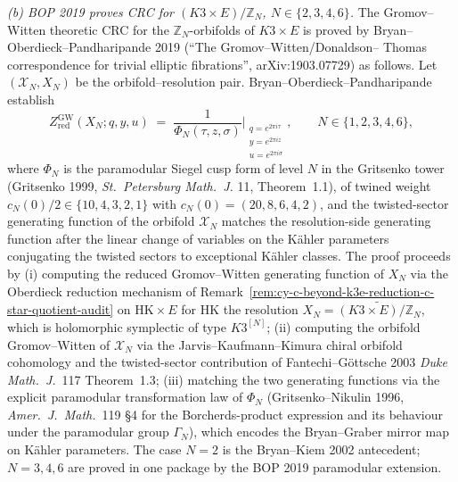 \begin{remark}
\emph{\textup{(b)} BOP 2019 proves CRC for $(K3\times
E)/\mathbb Z_N$, $N\in\{2,3,4,6\}$.} The Gromov--Witten theoretic CRC
for the $\mathbb Z_N$-orbifolds of $K3\times E$ is proved by
Bryan--Oberdieck--Pandharipande 2019 (``The Gromov--Witten/Donaldson--%
Thomas correspondence for trivial elliptic fibrations'',
arXiv:1903.07729) as follows. Let $(\mathcal X_N,X_N)$ be the
orbifold--resolution pair. Bryan--Oberdieck--Pandharipande establish
\[
 Z^{\mathrm{GW}}_{\mathrm{red}}(X_N;q,y,u)
 \;=\; \frac{1}{\Phi_N(\tau,z,\sigma)}\Big|_{\substack{q=e^{2\pi i\tau}\\y=e^{2\pi iz}\\u=e^{2\pi i\sigma}}},
 \qquad
 N\in\{1,2,3,4,6\},
\]
where $\Phi_N$ is the paramodular Siegel cusp form of level $N$ in
the Gritsenko tower (Gritsenko 1999, \emph{St.\ Petersburg Math.\ J.}
11, Theorem~1.1), of twined weight
$c_N(0)/2\in\{10,4,3,2,1\}$ with $c_N(0) = (20,8,6,4,2)$, and the
twisted-sector generating function of the orbifold $\mathcal X_N$
matches the resolution-side generating function after the linear
change of variables on the K\"ahler parameters conjugating the
twisted sectors to exceptional K\"ahler classes. The proof proceeds by
\textup{(i)} computing the reduced Gromov--Witten generating function
of $X_N$ via the Oberdieck reduction mechanism of
Remark~\ref{rem:cy-c-beyond-k3e-reduction-c-star-quotient-audit} on
$\mathrm{HK}\times E$ for $\mathrm{HK}$ the resolution
$X_N=\widetilde{(K3\times E)/\mathbb Z_N}$, which is holomorphic
symplectic of type $K3^{[N]}$;
\textup{(ii)} computing the orbifold Gromov--Witten of $\mathcal X_N$
via the Jarvis--Kaufmann--Kimura chiral orbifold cohomology and the
twisted-sector contribution of Fantechi--G\"ottsche 2003
\emph{Duke Math.\ J.}~117 Theorem~1.3; \textup{(iii)} matching the two
generating functions via the explicit paramodular transformation law
of $\Phi_N$ (Gritsenko--Nikulin 1996, \emph{Amer.\ J.\ Math.}~119 \S 4
for the Borcherds-product expression and its behaviour under the
paramodular group $\Gamma_N$), which encodes the Bryan--Graber mirror
map on K\"ahler parameters. The case $N=2$ is the Bryan--Kiem 2002
antecedent; $N=3,4,6$ are proved in one package by the BOP 2019
paramodular extension.


\end{remark}
